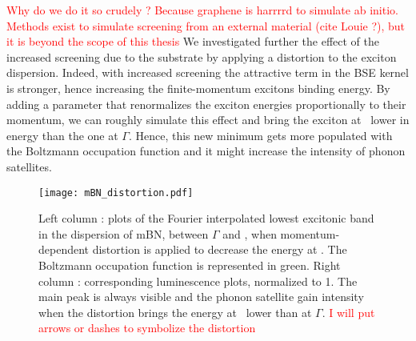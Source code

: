\textcolor{red}{Why do we do it so crudely ? Because graphene is harrrrd to simulate ab initio. Methods exist to simulate screening from an external material (cite Louie ?), but it is beyond the scope of this thesis}
We investigated further the effect of the increased screening due to the substrate by applying a distortion to the exciton dispersion. Indeed, with increased screening the attractive term in the BSE kernel is stronger, hence increasing the finite-momentum excitons binding energy. By adding a parameter that renormalizes the exciton energies proportionally to their momentum, we can roughly simulate this effect and bring the exciton at \KK~lower in energy than the one at $\Gamma$. Hence, this new minimum gets more populated with the Boltzmann occupation function and it might increase the intensity of phonon satellites.
\begin{figure}[H]
	\vspace{0.2cm}
	\setcapindent{2em}
	\centering
	\texttt{[image: mBN\_distortion.pdf]}
	\caption{Left column : plots of the Fourier interpolated lowest excitonic band in the dispersion of mBN, between $\Gamma$ and \KK, when momentum-dependent distortion is applied to decrease the energy at \KK. The Boltzmann occupation function is represented in green. Right column : corresponding luminescence plots, normalized to 1. The main peak is always visible and the phonon satellite gain intensity when the distortion brings the energy at \KK~lower than at $\Gamma$. \textcolor{red}{I will put arrows or dashes to symbolize the distortion}} %
    \label{fig:mBN_distortion}
\end{figure}
